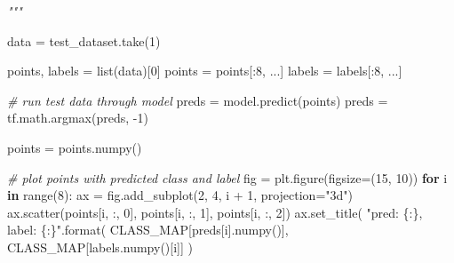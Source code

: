 \documentclass[
  12pt,
  a4paper,
]{article}
\newenvironment{Shaded}{}{}
\newcommand{\BuiltInTok}[1]{#1}
\newcommand{\CommentTok}[1]{\textcolor[rgb]{0.38,0.63,0.69}{\textit{#1}}}
\newcommand{\ControlFlowTok}[1]{\textcolor[rgb]{0.00,0.44,0.13}{\textbf{#1}}}
\newcommand{\DecValTok}[1]{\textcolor[rgb]{0.25,0.63,0.44}{#1}}
\newcommand{\KeywordTok}[1]{\textcolor[rgb]{0.00,0.44,0.13}{\textbf{#1}}}
\newcommand{\NormalTok}[1]{#1}
\newcommand{\OperatorTok}[1]{\textcolor[rgb]{0.40,0.40,0.40}{#1}}
\newcommand{\SpecialCharTok}[1]{\textcolor[rgb]{0.25,0.44,0.63}{#1}}
\newcommand{\StringTok}[1]{\textcolor[rgb]{0.25,0.44,0.63}{#1}}
\begin{document}
\begin{Shaded}
\begin{Highlighting}[]
\CommentTok{"""}

\NormalTok{data }\OperatorTok{=}\NormalTok{ test\_dataset.take(}\DecValTok{1}\NormalTok{)}

\NormalTok{points, labels }\OperatorTok{=} \BuiltInTok{list}\NormalTok{(data)[}\DecValTok{0}\NormalTok{]}
\NormalTok{points }\OperatorTok{=}\NormalTok{ points[:}\DecValTok{8}\NormalTok{, ...]}
\NormalTok{labels }\OperatorTok{=}\NormalTok{ labels[:}\DecValTok{8}\NormalTok{, ...]}

\CommentTok{\# run test data through model}
\NormalTok{preds }\OperatorTok{=}\NormalTok{ model.predict(points)}
\NormalTok{preds }\OperatorTok{=}\NormalTok{ tf.math.argmax(preds, }\OperatorTok{{-}}\DecValTok{1}\NormalTok{)}

\NormalTok{points }\OperatorTok{=}\NormalTok{ points.numpy()}

\CommentTok{\# plot points with predicted class and label}
\NormalTok{fig }\OperatorTok{=}\NormalTok{ plt.figure(figsize}\OperatorTok{=}\NormalTok{(}\DecValTok{15}\NormalTok{, }\DecValTok{10}\NormalTok{))}
\ControlFlowTok{for}\NormalTok{ i }\KeywordTok{in} \BuiltInTok{range}\NormalTok{(}\DecValTok{8}\NormalTok{):}
\NormalTok{    ax }\OperatorTok{=}\NormalTok{ fig.add\_subplot(}\DecValTok{2}\NormalTok{, }\DecValTok{4}\NormalTok{, i }\OperatorTok{+} \DecValTok{1}\NormalTok{, projection}\OperatorTok{=}\StringTok{"3d"}\NormalTok{)}
\NormalTok{    ax.scatter(points[i, :, }\DecValTok{0}\NormalTok{], points[i, :, }\DecValTok{1}\NormalTok{], points[i, :, }\DecValTok{2}\NormalTok{])}
\NormalTok{    ax.set\_title(}
        \StringTok{"pred: }\SpecialCharTok{\{:\}}\StringTok{, label: }\SpecialCharTok{\{:\}}\StringTok{"}\NormalTok{.}\BuiltInTok{format}\NormalTok{(}
\NormalTok{            CLASS\_MAP[preds[i].numpy()], CLASS\_MAP[labels.numpy()[i]]}
\NormalTok{        )}
\end{Highlighting}
\end{Shaded}
\end{document}
